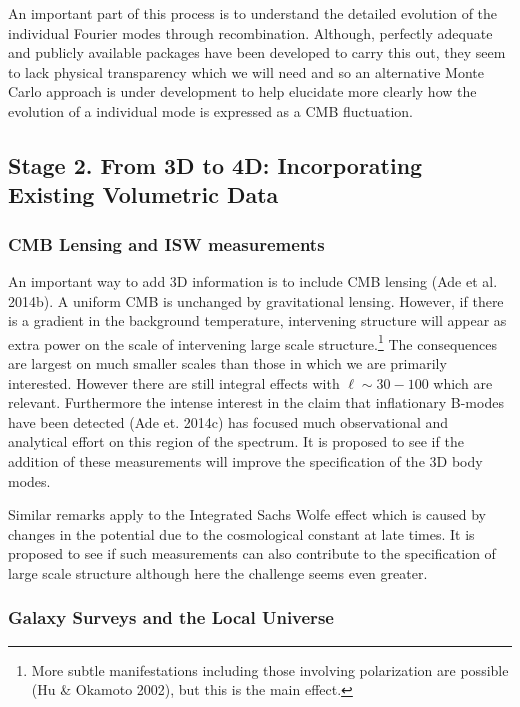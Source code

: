 \documentclass[psfig,11pt]{article}
\begin{document}
An important part of this process is to understand the detailed evolution of the individual Fourier modes through recombination. Although, perfectly adequate and publicly available packages have been developed to carry this out, they seem to lack physical transparency which we will need and so an alternative Monte Carlo approach is under development to help elucidate more clearly how the evolution of a individual mode is expressed as a CMB fluctuation.


\subsection{Stage 2. From 3D to 4D: Incorporating Existing Volumetric Data}

\subsubsection{CMB Lensing and ISW measurements}

An important way to add 3D information is to include CMB lensing (Ade et al. 2014b). A uniform CMB is unchanged by gravitational lensing. However, if there is a gradient in the background temperature, intervening structure will appear as extra power on the scale of intervening large scale structure.\footnote{More subtle manifestations including those involving polarization are possible (Hu \& Okamoto 2002), but this is the main effect.} The consequences are largest on much smaller scales than those in which we are primarily interested. However there are still integral effects with $\ell\sim30-100$ which are relevant. Furthermore the intense interest in the claim that inflationary B-modes have been detected (Ade et. 2014c)  has focused much observational and analytical effort on this region of the spectrum. It is proposed to see if the addition of these measurements will improve the specification of the 3D body modes.

Similar remarks apply to the Integrated Sachs Wolfe effect which is caused by changes in the potential due to the cosmological constant at late times. It is proposed to see if such measurements can also contribute to the specification of large scale structure although here the challenge seems even greater.

\subsubsection{Galaxy Surveys and the Local Universe}
\end{document}
